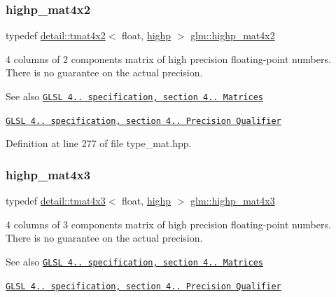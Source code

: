 \subsubsection{\texorpdfstring{highp\+\_\+mat4x2}{highp\_mat4x2}}
{\footnotesize\ttfamily typedef \hyperlink{structglm_1_1detail_1_1tmat4x2}{detail\+::tmat4x2}$<$ float, \hyperlink{namespaceglm_a0f04f086094c747d227af4425893f545ac6f7eab42eacbb10d59a58e95e362074}{highp} $>$ \hyperlink{group__core__precision_gadf9c4a7947c2b0a79f52cc86a860f270}{glm\+::highp\+\_\+mat4x2}}

4 columns of 2 components matrix of high precision floating-\/point numbers. There is no guarantee on the actual precision.

\begin{DoxySeeAlso}{See also}
\href{http://www.opengl.org/registry/doc/GLSLangSpec.4.20.8.pdf}{\tt G\+L\+SL 4.. specification, section 4.. Matrices} 

\href{http://www.opengl.org/registry/doc/GLSLangSpec.4.20.8.pdf}{\tt G\+L\+SL 4.. specification, section 4.. Precision Qualifier} 
\end{DoxySeeAlso}


Definition at line 277 of file type\+\_\+mat.\+hpp.

\mbox{\label{group__core__precision_gab8dfe989c5100c35ab5dec0e94f59d2a}} 
\subsubsection{\texorpdfstring{highp\+\_\+mat4x3}{highp\_mat4x3}}
{\footnotesize\ttfamily typedef \hyperlink{structglm_1_1detail_1_1tmat4x3}{detail\+::tmat4x3}$<$ float, \hyperlink{namespaceglm_a0f04f086094c747d227af4425893f545ac6f7eab42eacbb10d59a58e95e362074}{highp} $>$ \hyperlink{group__core__precision_gab8dfe989c5100c35ab5dec0e94f59d2a}{glm\+::highp\+\_\+mat4x3}}

4 columns of 3 components matrix of high precision floating-\/point numbers. There is no guarantee on the actual precision.

\begin{DoxySeeAlso}{See also}
\href{http://www.opengl.org/registry/doc/GLSLangSpec.4.20.8.pdf}{\tt G\+L\+SL 4.. specification, section 4.. Matrices} 

\href{http://www.opengl.org/registry/doc/GLSLangSpec.4.20.8.pdf}{\tt G\+L\+SL 4.. specification, section 4.. Precision Qualifier} 
\end{DoxySeeAlso}


